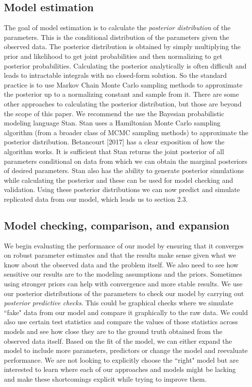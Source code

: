 \documentclass[12pt, oneside]{article}
\begin{document}
\subsection{Model estimation}
The goal of model estimation is to calculate the \textit{posterior distribution} of the parameters. This is the conditional distribution of the parameters given the observed data. The posterior distribution is obtained by simply multiplying the prior and likelihood to get joint probabilities and then normalizing to get posterior probabilities. Calculating the posterior analytically is often difficult and leads to intractable integrals with no closed-form solution. So the standard practice is to use Markov Chain Monte Carlo sampling methods to approximate the posterior up to a normalizing constant and sample from it. There are some other approaches to calculating the posterior distribution, but those are beyond the scope of this paper. We recommend the use the Bayesian probabilistic modeling language Stan. Stan uses a Hamiltonian Monte Carlo sampling algorithm (from a broader class of MCMC sampling methods) to approximate the posterior distribution. Betancourt [2017] has a clear exposition of how the algorithm works. It is sufficient that Stan returns the joint posterior of all parameters conditional on data from which we can obtain the marginal posteriors of desired parameters. Stan also has the ability to generate posterior simulations while calculating the posterior and these can be used for model checking and validation. Using these posterior distributions we can now predict and simulate replicated data from our model, which leads us to section 2.3. 
\subsection{Model checking, comparison, and expansion}
We begin evaluating the performance of our model by ensuring that it converges on robust parameter estimates and that the results make sense given what we know about the observed data and the problem itself. We also need to see how sensitive our results are to the modeling assumptions and the priors. Sometimes using stronger priors can help with convergence and more stable results. We use our posterior distributions of the parameters to check our model by carrying out \textit{posterior predictive checks}. This could be graphical checks where we simulate ``fake" data from our model and compare it graphically to the raw data. We could also use certain test statistics and compare the values of those statistics across models and see how close they are to the ground truth obtained from the observed data itself. Based on the fit of the model, we can either expand the model to include more parameters, predictors or change the model and reevaluate performance. We are not looking to explicitly choose the ``right" model but are interested to learn where each of our approaches and models might be lacking and make these shortcomings explicit while trying to improve them.
\end{document}

